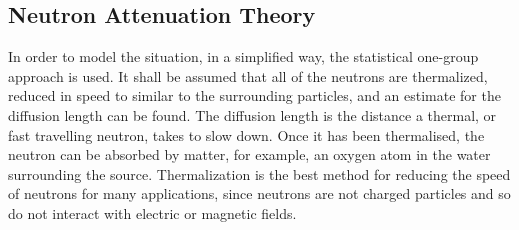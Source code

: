 \subsection{Neutron Attenuation Theory} %
\label{sub:neutron_attenuation_theory}
In order to model the situation, in a simplified way, the statistical one-group approach is used. It shall be assumed that all of the neutrons are thermalized, reduced in speed to similar to the surrounding particles, and an estimate for the diffusion length can be found. The diffusion length is the distance a thermal, or fast travelling neutron, takes to slow down. Once it has been thermalised, the neutron can be absorbed by matter, for example, an oxygen atom in the water surrounding the source. Thermalization is the best method for reducing the speed of neutrons for many applications, since neutrons are not charged particles and so do not interact with electric or magnetic fields.

